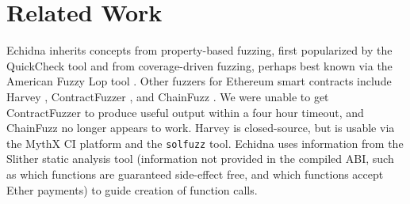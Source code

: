 \section{Related Work}

Echidna inherits concepts from property-based fuzzing, first popularized by the QuickCheck tool \cite{ClaessenH00} and from coverage-driven fuzzing, perhaps best known via the American Fuzzy Lop tool \cite{aflfuzz}.  Other fuzzers for Ethereum smart contracts include Harvey \cite{harvey}, ContractFuzzer \cite{contractfuzzer}, and ChainFuzz \cite{chainfuzz}.  We were unable to get ContractFuzzer to produce useful output within a four hour timeout, and ChainFuzz no longer appears to work.  Harvey is closed-source, but is usable via the MythX \cite{mythx} CI platform and the {\tt solfuzz} \cite{solfuzz} tool.  Echidna uses information from the Slither static analysis tool \cite{slitherpaper} (information not provided in the compiled ABI, such as which functions are guaranteed side-effect free, and which functions accept Ether payments) to guide creation of function calls.